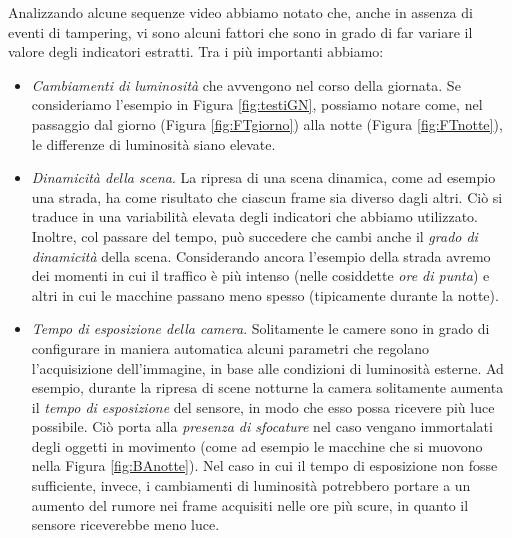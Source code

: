 Analizzando alcune sequenze video abbiamo notato che, anche in assenza di eventi di tampering, vi sono alcuni fattori che sono in grado di far variare il valore degli indicatori estratti.
Tra i pi\`u importanti abbiamo:
\begin{itemize}
	\item \textit{Cambiamenti di luminosit\`a} che avvengono nel corso della giornata. 
	Se consideriamo l'esempio in Figura \ref{fig:testiGN}, possiamo notare come, nel passaggio dal giorno (Figura \ref{fig:FTgiorno}) alla notte (Figura \ref{fig:FTnotte}), le differenze di luminosit\`a siano elevate.  
	\item \textit{Dinamicit\`a della scena}. La ripresa di una scena dinamica, come ad esempio una strada, ha come risultato che ciascun frame sia diverso dagli altri.
	Ci\`o si traduce in una variabilit\`a elevata degli indicatori che abbiamo utilizzato. 
	Inoltre, col passare del tempo, pu\`o succedere che cambi anche il \textit{grado di dinamicit\`a} della scena.
	Considerando ancora l'esempio della strada avremo dei momenti in cui il traffico \`e pi\`u intenso (nelle cosiddette \textit{ore di punta}) e altri in cui le macchine passano meno spesso (tipicamente durante la notte).
	\item \textit{Tempo di esposizione della camera}. Solitamente le camere sono in grado di configurare in maniera automatica alcuni parametri che regolano l'acquisizione dell'immagine, in base alle condizioni di luminosit\`a esterne.
	Ad esempio, durante la ripresa di scene notturne la camera solitamente aumenta il \textit{tempo di esposizione} del sensore, in modo che esso possa ricevere pi\`u luce possibile.
	Ci\`o porta alla \textit{presenza di sfocature} nel caso vengano immortalati degli oggetti in movimento (come ad esempio le macchine che si muovono nella Figura \ref{fig:BAnotte}).
	Nel caso in cui il tempo di esposizione non fosse sufficiente, invece, i cambiamenti di luminosit\`a potrebbero portare a un aumento del rumore nei frame acquisiti nelle ore pi\`u scure, in quanto il sensore riceverebbe meno luce.
\end{itemize} 
